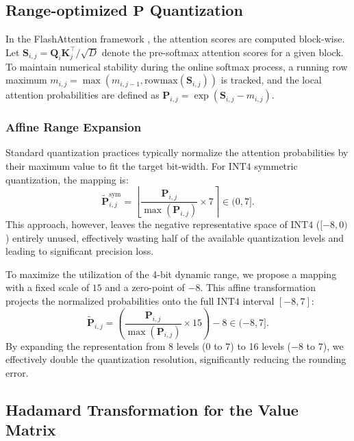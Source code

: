 \subsection{Range-optimized $\mathbf{P}$ Quantization}

In the FlashAttention framework \cite{dao2022flashattention,dao2024flashattention,shah2024flashattention}, the attention scores are computed block-wise. Let $\mathbf{S}_{i,j} = \mathbf{Q}_i \mathbf{K}_j^\top / \sqrt{D}$ denote the pre-softmax attention scores for a given block. To maintain numerical stability during the online softmax process, a running row maximum $m_{i,j} = \max(m_{i,j-1}, \text{rowmax}(\mathbf{S}_{i,j}))$ is tracked, and the local attention probabilities are defined as $\mathbf{P}_{i,j} = \exp(\mathbf{S}_{i,j} - m_{i,j})$.

\subsubsection{Affine Range Expansion}

Standard quantization practices typically normalize the attention probabilities by their maximum value to fit the target bit-width. For $\text{INT4}$ symmetric quantization, the mapping is:
\begin{equation}
    \tilde{\mathbf{P}}_{i,j}^{\text{sym}} = \left\lfloor \frac{\mathbf{P}_{i,j}}{\max(\mathbf{P}_{i,j})} \times 7 \right\rceil \in (0, 7].
\end{equation}
This approach, however, leaves the negative representative space of $\text{INT4}$ ($[-8, 0)$) entirely unused, effectively wasting half of the available quantization levels and leading to significant precision loss.

To maximize the utilization of the 4-bit dynamic range, we propose a mapping with a fixed scale of $15$ and a zero-point of $-8$. This affine transformation projects the normalized probabilities onto the full $\text{INT4}$ interval $[-8, 7]$:
\begin{equation}
    \tilde{\mathbf{P}}_{i,j} = \left( \frac{\mathbf{P}_{i,j}}{\max(\mathbf{P}_{i,j})} \times 15 \right) - 8 \in (-8, 7].
\end{equation}
By expanding the representation from 8 levels ($0$ to $7$) to 16 levels ($-8$ to $7$), we effectively double the quantization resolution, significantly reducing the rounding error.




\subsection{Hadamard Transformation for the Value Matrix}
\label{ssec:hadamard_v}

